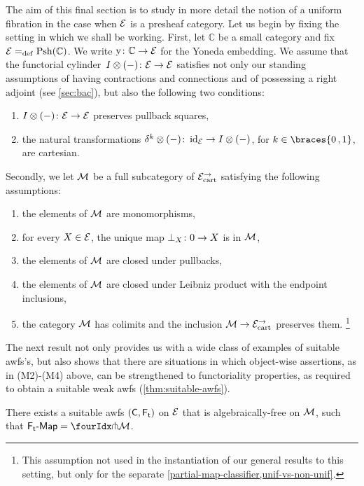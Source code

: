 \documentclass[reqno,10pt,a4paper,oneside,draft]{amsart}
\begin{document}
{{The aim of this final section is to study in more detail the notion of a uniform fibration in the case when $\cal{E}$ is a presheaf category.
Let us begin by fixing the setting in which we shall be working.
First, let $\mathbb{C}$ be a small category and fix $\cal{E} \defeq \Psh(\mathbb{C})$.
We write $\yon \co \mathbb{C} \to \cal{E}$ for the Yoneda embedding.
We assume that the functorial cylinder~$\interval \otimes (-) \co \cal{E} \to \cal{E}$ satisfies not only our standing assumptions of having contractions and connections and of possessing a right adjoint (see \cref{sec:bac}), but also the following two conditions:
\begin{enumerate}[({C}1)]
\item $\interval \otimes (-) \co \cal{E} \to \cal{E}$ preserves pullback squares,
\item the natural transformations $\kcyl \otimes (-) \co \id_\cal{E} \to \interval \otimes (-)$, for $k \in \braces{0\,, 1}$, are cartesian.
\end{enumerate}
Secondly, we let $\cal{M}$ be a full subcategory of $\cal{E}^\to_\cart$ satisfying the following assumptions:
\begin{enumerate}[({M}1)]
\item the elements of $\cal{M}$ are monomorphisms,
\item for every $X \in \cal{E}$, the unique map $\bot_X \co 0 \to X$ is in $\cal{M}$,
\item the elements of $\cal{M}$ are closed under pullbacks,
\item the elements of $\cal{M}$ are closed under Leibniz product with the endpoint inclusions,
\item the category $\cal{M}$ has colimits and the inclusion $\cal{M} \to \cal{E}^\to_\mathrm{cart}$ preserves them.%
\footnote{This assumption not used in the instantiation of our general results to this setting, but only for the separate \cref{partial-map-classifier,unif-vs-non-unif}.}
\end{enumerate}
The next result not only provides us with a wide class of examples of suitable awfs's, but also shows that there are situations in which object-wise assertions, as in (M2)-(M4) above, can be strengthened to functoriality properties, as required to obtain a suitable weak awfs (\cref{thm:suitable-awfs}).

\begin{theorem} \label{rem-lift-suitable}
There exists a suitable awfs $(\CC, \TF)$ on $\cal{E}$ that is algebraically-free on $\cal{M}$, \ie such that $\pAlg{\TF} = \liftr{\cal{M}}$.
\end{theorem}

}}
\end{document}
